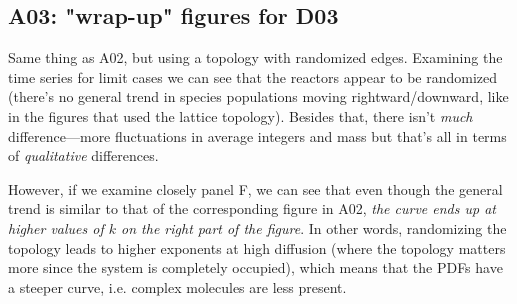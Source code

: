 \documentclass[11pt]{article}
\begin{document}
\clearpage

\subsection{A03: "wrap-up" figures for D03}
\label{subsec:A03}

Same thing as A02, but using a topology with randomized edges. Examining the time series for limit cases we can see that the reactors appear to be randomized (there’s no general trend in species populations moving rightward/downward, like in the figures that used the lattice topology). Besides that, there isn’t \textit{much} difference---more fluctuations in average integers and mass but that’s all in terms of \textit{qualitative} differences. 

However, if we examine closely panel F, we can see that even though the general trend is similar to that of the corresponding figure in A02, \textit{the curve ends up at higher values of $k$ on the right part of the figure}. In other words, randomizing the topology leads to higher exponents at high diffusion (where the topology matters more since the system is completely occupied), which means that the PDFs have a steeper curve, i.e. complex molecules are less present.
\end{document}
